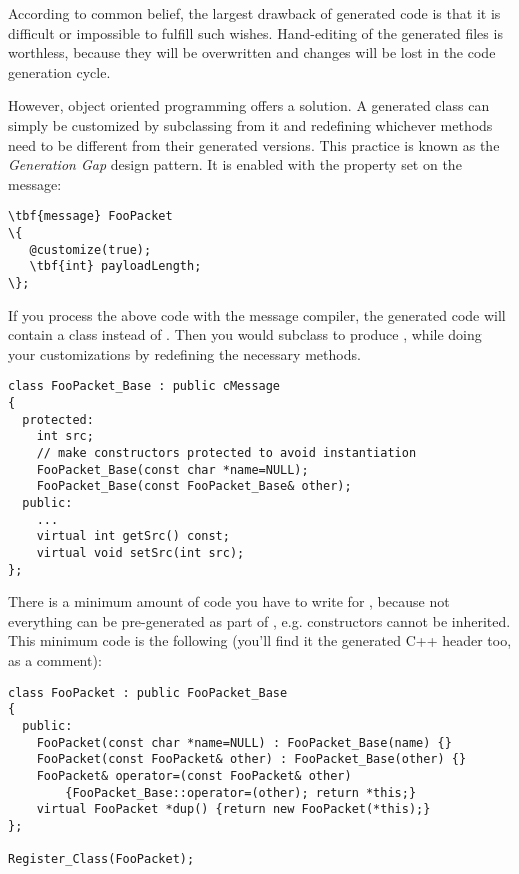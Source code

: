 According to common belief, the largest drawback of generated code
is that it is difficult or impossible to fulfill such wishes.
Hand-editing of the generated files is worthless, because
they will be overwritten and changes will be lost
in the code generation cycle.

However, object oriented programming offers a solution.
A generated class can simply be customized by subclassing
from it and redefining whichever methods need to be
different from their generated versions. This practice
is known as the \textit{Generation Gap} design pattern.
It is enabled with the  property set on the
message:

\begin{Verbatim}[commandchars=\\\{\}]
\tbf{message} FooPacket
\{
   @customize(true);
   \tbf{int} payloadLength;
\};
\end{Verbatim}

If you process the above code with the message compiler,
the generated code will contain a  class
instead of . Then you would subclass
 to produce ,
while doing your customizations by redefining the necessary methods.

\begin{verbatim}
class FooPacket_Base : public cMessage
{
  protected:
    int src;
    // make constructors protected to avoid instantiation
    FooPacket_Base(const char *name=NULL);
    FooPacket_Base(const FooPacket_Base& other);
  public:
    ...
    virtual int getSrc() const;
    virtual void setSrc(int src);
};
\end{verbatim}

There is a minimum amount of code you have to write
for , because not everything can be
pre-generated as part of , e.g.
constructors cannot be inherited. This minimum
code is the following (you'll find it the generated C++ header
too, as a comment):

\begin{verbatim}
class FooPacket : public FooPacket_Base
{
  public:
    FooPacket(const char *name=NULL) : FooPacket_Base(name) {}
    FooPacket(const FooPacket& other) : FooPacket_Base(other) {}
    FooPacket& operator=(const FooPacket& other)
        {FooPacket_Base::operator=(other); return *this;}
    virtual FooPacket *dup() {return new FooPacket(*this);}
};

Register_Class(FooPacket);
\end{verbatim}

